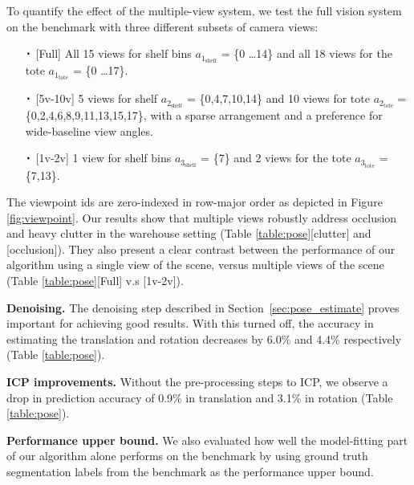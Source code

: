 \documentclass[letterpaper, 10 pt, conference]{ieeeconf}  %
\newcommand{\secref}[1]{Section~\ref{#1}}
\newcommand*{\Cdot}{\raisebox{-0.25ex}{\scalebox{1.75}{$\cdot$}}}
\newcommand{\myparagraph}[1]{\vspace{0.1in}\noindent\textbf{#1}}
\begin{document}
To quantify the effect of the multiple-view system, we test the full vision system on the benchmark with three different subsets of camera views: 
\begin{itemize}
\item[$\Cdot$] [Full] All 15 views for shelf bins $a_{1_\text{shelf}}$ = \{0 \ldots 14\} and all 18 views for the tote $a_{1_\text{tote}}$ = \{0 \ldots 17\}.
\item[$\Cdot$] [5v-10v] 5 views for shelf $a_{2_\text{shelf}}$ = \{0,4,7,10,14\} and 10 views for tote $a_{2_\text{tote}}=$\{0,2,4,6,8,9,11,13,15,17\}, with a sparse arrangement and a preference for wide-baseline view angles.
\item[$\Cdot$] [1v-2v] 1 view for shelf bins $a_{3_\text{shelf}}$ = \{7\} 
and 2 views for the tote $a_{3_\text{tote}}$ =\{7,13\}.
\end{itemize}
The viewpoint ids are zero-indexed in row-major order as depicted in Figure \ref{fig:viewpoint}.
Our results show that multiple views robustly address occlusion and heavy clutter in the warehouse setting (Table \ref{table:pose}[clutter] and [occlusion]).
They also present a clear contrast between the performance of our algorithm using a single view of the scene, versus multiple views of the scene (Table \ref{table:pose}[Full] v.s [1v-2v]). 



\myparagraph{Denoising.} The denoising step described in \secref{sec:pose_estimate} proves important for achieving good results. With this turned off, the accuracy in estimating the translation and rotation decreases by 6.0\% and 4.4\% respectively (Table \ref{table:pose}). 


\myparagraph{ICP improvements.} Without the pre-processing steps to ICP, we observe a drop in prediction accuracy of 0.9\% in translation and 3.1\% in rotation (Table \ref{table:pose}).


\myparagraph{Performance upper bound.} We also evaluated how well the model-fitting part of our algorithm alone performs on the benchmark by using ground truth segmentation labels from the benchmark as the performance upper bound.
\end{document}
